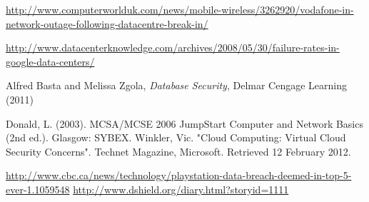 \documentclass[11pt, twocolumn]{article}
\begin{document}
\begin{thebibliography}{}
  \url{http://www.computerworlduk.com/news/mobile-wireless/3262920/vodafone-in-network-outage-following-datacentre-break-in/}

  \url{http://www.datacenterknowledge.com/archives/2008/05/30/failure-rates-in-google-data-centers/}

  Alfred Basta and Melissa Zgola, {\it Database Security}, Delmar Cengage Learning (2011)

 Donald, L. (2003). MCSA/MCSE 2006 JumpStart Computer and Network Basics (2nd ed.). Glasgow: SYBEX.
 Winkler, Vic. "Cloud Computing: Virtual Cloud Security Concerns". Technet Magazine, Microsoft. Retrieved 12 February 2012.

 \url{http://www.cbc.ca/news/technology/playstation-data-breach-deemed-in-top-5-ever-1.1059548}
 \url{http://www.dshield.org/diary.html?storyid=1111}

\end{thebibliography}
\end{document}
